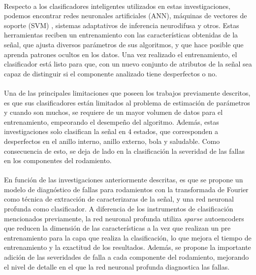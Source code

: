 \documentclass[12pt]{article}%
\begin{document}
\paragraph{}
Respecto a los clasificadores inteligentes utilizados en estas investigaciones, podemos encontrar redes neuronales artificiales (ANN), máquinas de vectores de soporte (SVM) \cite{konar}, sistemas adaptativos de inferencia neurodifusa \cite{issam} y otros. Estas herramientas reciben un entrenamiento con las características obtenidas de la señal, que ajusta diversos parámetros de sus algoritmos, y que hace posible que aprenda patrones ocultos en los datos. Una vez realizado el entrenamiento, el clasificador está listo para que, con un nuevo conjunto de atributos de la señal sea capaz de distinguir si el componente analizado tiene desperfectos o no.

\paragraph{}
Una de las principales limitaciones que poseen los trabajos previamente descritos, es que sus clasificadores están limitados al problema de estimación de parámetros y cuando son muchos, se requiere de un mayor volumen de datos para el entrenamiento, empeorando el desempeño del algoritmo. Además, estas investigaciones solo clasifican la señal en 4 estados, que corresponden a desperfectos en el anillo interno, anillo externo, bola y saludable. Como consecuencia de esto, se deja de lado en la clasificación la severidad de las fallas en los componentes del rodamiento.

\paragraph{}
En función de las investigaciones anteriormente descritas, es que se propone un modelo de diagnóstico de fallas para rodamientos con la transformada de Fourier como técnica de extracción de caracterizaras de la señal, y una red neuronal profunda como clasificador. A diferencia de los instrumentos de clasificación mencionados previamente, la red neuronal profunda utiliza \textit{sparse} autoencoders que reducen la dimensión de las características a la vez que realizan un pre entrenamiento para la capa que realiza la clasificación, lo que mejora el tiempo de entrenamiento y la exactitud de los resultados. Además, se propone la importante adición de las severidades de falla a cada componente del rodamiento, mejorando el nivel de detalle en el que la red neuronal profunda diagnostica las fallas.
\end{document}
